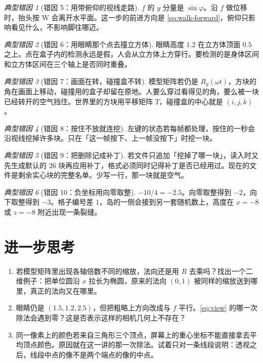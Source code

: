 \documentclass[12pt,a4paper]{article}
\theoremstyle{definition}
\theoremstyle{plain}
\theoremstyle{remark}
\newtheorem*{pitfall}{典型错因}
\begin{document}
\begin{pitfall}[错因 5：用带俯仰的视线走路]
$f$ 的 $y$ 分量是 $\sin\varphi$。沿 $f$ 做位移时，抬头按 W 会离开水平面。这一步的前进方向是 \eqref{eq:walk-forward}，俯仰只影响看见什么，不影响脚往哪迈。
\end{pitfall}

\begin{pitfall}[错因 6：用眼睛那个点去撞立方体]
眼睛高度 $1.2$ 在立方体顶面 $0.5$ 之上。点在盒子内的检测永远是假，人会从立方体上方穿行。要检测的是身体区间和立方体区间在三个轴上是否同时重叠。
\end{pitfall}

\begin{pitfall}[错因 7：画面在转，碰撞盒不转]
模型矩阵若仍是 $R_y(\omega t)$，方块的角在画面上移动，碰撞用的盒子却留在原地。人要么穿过看得见的角，要么被一块已经转开的空气挡住。世界里的方块用平移矩阵 $T$，碰撞盒的中心就是 $(i,j,k)$。
\end{pitfall}

\begin{pitfall}[错因 8：按住不放就连挖]
左键的状态若每帧都处理，按住的一秒会沿视线挖掉许多块。只在「这一帧按下、上一帧没按下」时挖一块。
\end{pitfall}

\begin{pitfall}[错因 9：把删除记成补丁]
若文件只追加「挖掉了哪一块」，读入时又先生成默认的 \(26\) 块再应用补丁，格式必须同时记得补丁是否已经用过。现在的文件是剩余实心块的完整名单。少写一行，那一块就是空气。
\end{pitfall}

\begin{pitfall}[错因 10：负坐标用向零取整]
\(-10/4=-2.5\)。向零取整得到 \(-2\)，向下取整得到 \(-3\)。格子编号差 \(1\)，岛的一侧会接到另一套随机数上，高度在 \(x=-8\) 或 \(z=-8\) 附近出现一条裂缝。
\end{pitfall}

\section{进一步思考}

\begin{enumerate}
\item 若模型矩阵里出现各轴倍数不同的缩放，法向还是用 $R$ 去乘吗？找出一个二维例子：把单位圆沿 $x$ 拉长为椭圆，原来的法向 $(0,1)$ 被同样的缩放送到哪里，真正的法向又在哪里。
\item 眼睛仍是 $(1.5,1.2,2.5)$，但把粗略上方向改成与 $f$ 平行。\eqref{eq:view} 的哪一次除法会遇到零？这是否表示这样的相机几何上不存在？
\item 同一像素上的颜色若来自三角形三个顶点，屏幕上的重心坐标不能直接拿去平均顶点颜色。原因就在这一讲的那一次除法。试着只对一条线段说明：透视之后，线段中点的像不是两个端点的像的中点。
\end{enumerate}
\end{document}
